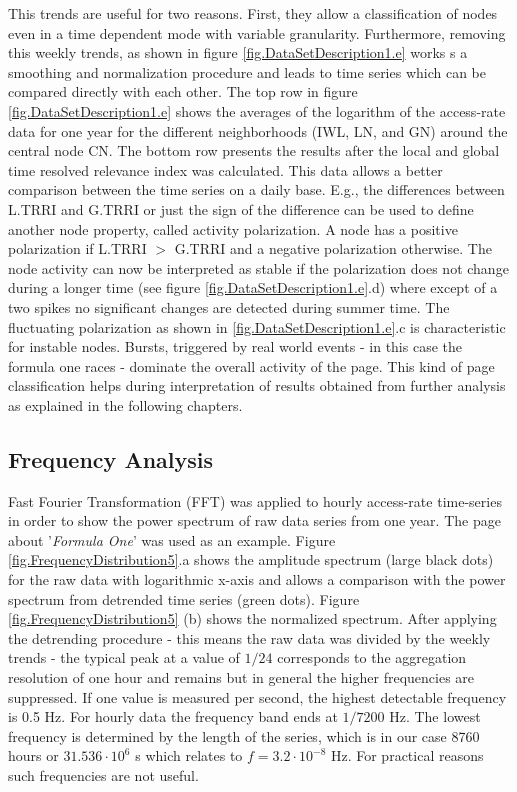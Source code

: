\documentclass[a4paper,10pt]{scrbook}
\begin{document}
This trends are useful for two reasons. First, they allow a classification of nodes even in a time dependent mode with variable granularity. Furthermore, removing this weekly trends, as shown in figure \ref{fig.DataSetDescription1.e} works s a smoothing and normalization procedure and leads to time series which can be compared directly with each other. The top row in figure \ref{fig.DataSetDescription1.e} shows the averages of the logarithm of the access-rate data for one year for the different neighborhoods (IWL, LN, and GN) around the central node CN. The bottom row presents the results after the local and global time resolved relevance index was calculated. This data allows a better comparison between the time series on a daily base. E.g., the differences between L.TRRI and G.TRRI or just the sign of the difference can be used to define another node property, called activity polarization. A node has a positive polarization if L.TRRI $>$ G.TRRI and a negative polarization otherwise. The node activity can now be interpreted as stable if the polarization does not change during a longer time (see figure \ref{fig.DataSetDescription1.e}.d) where except of a two spikes no significant changes are detected during summer time. The fluctuating polarization as shown in \ref{fig.DataSetDescription1.e}.c is characteristic for instable nodes. Bursts, triggered by real world events - in this case the formula one races - dominate the overall activity of the page. This kind of page classification helps during interpretation of results obtained from further analysis as explained in the following chapters.

\clearpage
\newpage

\subsection{Frequency Analysis}
%
%
Fast Fourier Transformation (FFT) was applied to hourly access-rate time-series in order to show the power spectrum of raw data series from one year. The page about '\textit{Formula One}' was used as an example. Figure \ref{fig.FrequencyDistribution5}.a shows the amplitude spectrum (large black dots) for the raw data with logarithmic x-axis and allows a comparison with the power spectrum from detrended time series (green dots). Figure \ref{fig.FrequencyDistribution5} (b)  shows the normalized spectrum. After applying the detrending procedure - this means the raw data was divided by the weekly trends - the typical peak at a value of $1/24$ corresponds to the aggregation resolution of one hour and remains but in general the higher frequencies are suppressed. 
If one value is measured per second, the highest detectable frequency is 0.5 Hz. For hourly data the frequency band ends at $1 / 7200$ Hz. The lowest frequency is determined by the length of the series, which is in our case 8760 hours or $31.536 \cdot  10^6$ s which relates to $f=3.2 \cdot  10^{-8}$ Hz. For practical reasons such frequencies are not useful.
 
\end{document}
